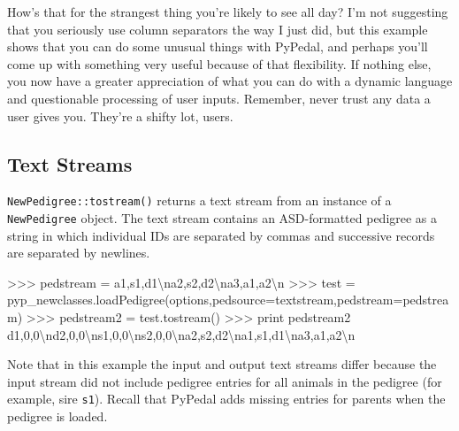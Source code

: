 \documentclass[
  letterpaper,
  DIV=11,
  numbers=noendperiod]{scrreprt}
\newenvironment{Shaded}{\begin{snugshade}}{\end{snugshade}}
\newcommand{\BuiltInTok}[1]{\textcolor[rgb]{0.00,0.23,0.31}{#1}}
\newcommand{\CharTok}[1]{\textcolor[rgb]{0.13,0.47,0.30}{#1}}
\newcommand{\CommentTok}[1]{\textcolor[rgb]{0.37,0.37,0.37}{#1}}
\newcommand{\NormalTok}[1]{\textcolor[rgb]{0.00,0.23,0.31}{#1}}
\newcommand{\OperatorTok}[1]{\textcolor[rgb]{0.37,0.37,0.37}{#1}}
\newcommand{\StringTok}[1]{\textcolor[rgb]{0.13,0.47,0.30}{#1}}
\begin{document}
How's that for the strangest thing you're likely to see all day? I'm not
suggesting that you seriously use column separators the way I just did,
but this example shows that you can do some unusual things with PyPedal,
and perhaps you'll come up with something very useful because of that
flexibility. If nothing else, you now have a greater appreciation of
what you can do with a dynamic language and questionable processing of
user inputs. Remember, never trust any data a user gives you. They're a
shifty lot, users.

\subsection{Text Streams}\label{text-streams-1}

\texttt{NewPedigree::tostream()} returns a text stream from an instance
of a \texttt{NewPedigree} object. The text stream contains an
ASD-formatted pedigree as a string in which individual IDs are separated
by commas and successive records are separated by newlines.

\begin{Shaded}
\begin{Highlighting}[]
\OperatorTok{\textgreater{}\textgreater{}\textgreater{}}\NormalTok{ pedstream }\OperatorTok{=} \StringTok{\textquotesingle{}a1,s1,d1}\CharTok{\textbackslash{}n}\StringTok{a2,s2,d2}\CharTok{\textbackslash{}n}\StringTok{a3,a1,a2}\CharTok{\textbackslash{}n}\StringTok{\textquotesingle{}}
\OperatorTok{\textgreater{}\textgreater{}\textgreater{}}\NormalTok{ test }\OperatorTok{=}\NormalTok{ pyp\_newclasses.loadPedigree(options,pedsource}\OperatorTok{=}\StringTok{\textquotesingle{}textstream\textquotesingle{}}\NormalTok{,pedstream}\OperatorTok{=}\NormalTok{pedstream)}
\OperatorTok{\textgreater{}\textgreater{}\textgreater{}}\NormalTok{ pedstream2 }\OperatorTok{=}\NormalTok{ test.tostream()}
\OperatorTok{\textgreater{}\textgreater{}\textgreater{}} \BuiltInTok{print}\NormalTok{ pedstream2}
\CommentTok{\textquotesingle{}d1,0,0}\CharTok{\textbackslash{}n}\CommentTok{d2,0,0}\CharTok{\textbackslash{}n}\CommentTok{s1,0,0}\CharTok{\textbackslash{}n}\CommentTok{s2,0,0}\CharTok{\textbackslash{}n}\CommentTok{a2,s2,d2}\CharTok{\textbackslash{}n}\CommentTok{a1,s1,d1}\CharTok{\textbackslash{}n}\CommentTok{a3,a1,a2}\CharTok{\textbackslash{}n}\CommentTok{\textquotesingle{}}
\end{Highlighting}
\end{Shaded}

Note that in this example the input and output text streams differ
because the input stream did not include pedigree entries for all
animals in the pedigree (for example, sire \texttt{s1}). Recall that
PyPedal adds missing entries for parents when the pedigree is loaded.
\end{document}
